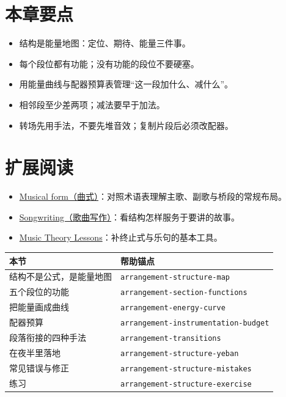 \section{本章要点}
\label{sec:structure-takeaways}

\begin{itemize}
\item 结构是能量地图：定位、期待、能量三件事。
\item 每个段位都有功能；没有功能的段位不要硬塞。
\item 用能量曲线与配器预算表管理“这一段加什么、减什么”。
\item 相邻段至少差两项；减法要早于加法。
\item 转场先用手法，不要先堆音效；复制片段后必须改配器。
\end{itemize}

\section{扩展阅读}
\label{sec:02-structure-further-reading}
\begin{itemize}
  \item \href{https://en.wikipedia.org/wiki/Musical_form}{Musical form（曲式）}：对照术语表理解主歌、副歌与桥段的常规布局。
  \item \href{https://en.wikipedia.org/wiki/Songwriting}{Songwriting（歌曲写作）}：看结构怎样服务于要讲的故事。
  \item \href{https://www.musictheory.net/lessons}{Music Theory Lessons}：补终止式与乐句的基本工具。
\end{itemize}

\begin{helpmapping}
\begin{longtable}{p{}p{}}
\toprule
本节 & 帮助锚点 \\
\midrule
结构不是公式，是能量地图 & \texttt{arrangement-structure-map} \\
五个段位的功能 & \texttt{arrangement-section-functions} \\
把能量画成曲线 & \texttt{arrangement-energy-curve} \\
配器预算 & \texttt{arrangement-instrumentation-budget} \\
段落衔接的四种手法 & \texttt{arrangement-transitions} \\
在夜半里落地 & \texttt{arrangement-structure-yeban} \\
常见错误与修正 & \texttt{arrangement-structure-mistakes} \\
练习 & \texttt{arrangement-structure-exercise} \\
\bottomrule
\end{longtable}
\end{helpmapping}
